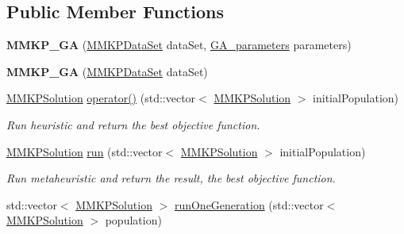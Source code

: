 \subsection*{Public Member Functions}
\begin{DoxyCompactItemize}
\item 
\hypertarget{class_m_m_k_p___g_a_a970a4006be6cc6945c29b9bb4ff3dc31}{{\bfseries M\+M\+K\+P\+\_\+\+G\+A} (\hyperlink{class_m_m_k_p_data_set}{M\+M\+K\+P\+Data\+Set} data\+Set, \hyperlink{class_g_a__parameters}{G\+A\+\_\+parameters} parameters)}\label{class_m_m_k_p___g_a_a970a4006be6cc6945c29b9bb4ff3dc31}

\item 
\hypertarget{class_m_m_k_p___g_a_ad3df4704df221933c8e2377dd765ed5f}{{\bfseries M\+M\+K\+P\+\_\+\+G\+A} (\hyperlink{class_m_m_k_p_data_set}{M\+M\+K\+P\+Data\+Set} data\+Set)}\label{class_m_m_k_p___g_a_ad3df4704df221933c8e2377dd765ed5f}

\item 
\hyperlink{class_m_m_k_p_solution}{M\+M\+K\+P\+Solution} \hyperlink{class_m_m_k_p___g_a_aeeda12afb45c59bd18f9761a75765331}{operator()} (std\+::vector$<$ \hyperlink{class_m_m_k_p_solution}{M\+M\+K\+P\+Solution} $>$ initial\+Population)
\begin{DoxyCompactList}\small\item\em Run heuristic and return the best objective function. \end{DoxyCompactList}\item 
\hypertarget{class_m_m_k_p___g_a_a64990a8141476468684581138ee966ec}{\hyperlink{class_m_m_k_p_solution}{M\+M\+K\+P\+Solution} \hyperlink{class_m_m_k_p___g_a_a64990a8141476468684581138ee966ec}{run} (std\+::vector$<$ \hyperlink{class_m_m_k_p_solution}{M\+M\+K\+P\+Solution} $>$ initial\+Population)}\label{class_m_m_k_p___g_a_a64990a8141476468684581138ee966ec}

\begin{DoxyCompactList}\small\item\em Run metaheuristic and return the result, the best objective function. \end{DoxyCompactList}\item 
\hypertarget{class_m_m_k_p___g_a_a3b2479268204cedada4d245c9ae23170}{std\+::vector$<$ \hyperlink{class_m_m_k_p_solution}{M\+M\+K\+P\+Solution} $>$ \hyperlink{class_m_m_k_p___g_a_a3b2479268204cedada4d245c9ae23170}{run\+One\+Generation} (std\+::vector$<$ \hyperlink{class_m_m_k_p_solution}{M\+M\+K\+P\+Solution} $>$ population)}\label{class_m_m_k_p___g_a_a3b2479268204cedada4d245c9ae23170}


\end{DoxyCompactItemize}
